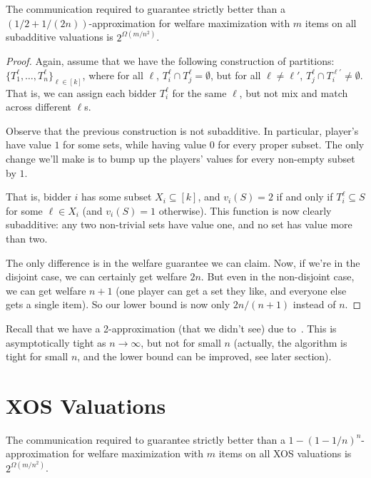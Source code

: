   \begin{theorem}The
    communication required to guarantee strictly better than a
    $(1/2+1/(2n))$-approximation for welfare maximization with $m$ items on all
    subadditive valuations is $2^{\Omega(m/n^2)}$.  
  \end{theorem} 
  \begin{proof}
    Again, assume that we have the following construction of partitions:
    $\{T_1^\ell,\ldots, T_n^\ell\}_{\ell \in [k]}$, where for all $\ell$,
    $T_i^\ell \cap T_j^\ell = \emptyset$, but for all $\ell \neq \ell'$,
    $T_j^\ell \cap T_i^{\ell'} \neq \emptyset$. That is, we can assign each
    bidder $T_i^\ell$ for the same $\ell$, but not mix and match across
    different $\ell$s.

    Observe that the previous construction is not subadditive. In particular,
    player's have value $1$ for some sets, while having value $0$ for every proper
    subset. The only change we'll make is to bump up the players' values for every
    non-empty subset by $1$. 

    That is, bidder $i$ has some subset $X_i \subseteq [k]$, and $v_i(S) = 2$ if and
    only if $T_i^\ell \subseteq S$ for some $\ell \in X_i$ (and $v_i(S) = 1$
    otherwise). This function is now clearly subadditive: any two non-trivial sets
    have value one, and no set has value more than two. 

    The only difference is in the welfare guarantee we can claim. Now, if we're in
    the disjoint case, we can certainly get welfare $2n$. But even in the
    non-disjoint case, we can get welfare $n+1$ (one player can get a set they like,
    and everyone else gets a single item). So our lower bound is now only $2n/(n+1)$
    instead of $n$.
  \end{proof}

  Recall that we have a 2-approximation (that we didn't see) due
  to~\cite{Feige06}. This is asymptotically tight as $n\rightarrow \infty$, but
  not for small $n$ (actually, the algorithm is tight for small $n$, and the lower
  bound can be improved, see later section). 

\section{XOS Valuations}

  \begin{theorem}
    The communication
    required to guarantee strictly better than a $1-(1-1/n)^n$-approximation for
    welfare maximization with $m$ items on all XOS valuations is
    $2^{\Omega(m/n^2)}$.  
  \end{theorem}

